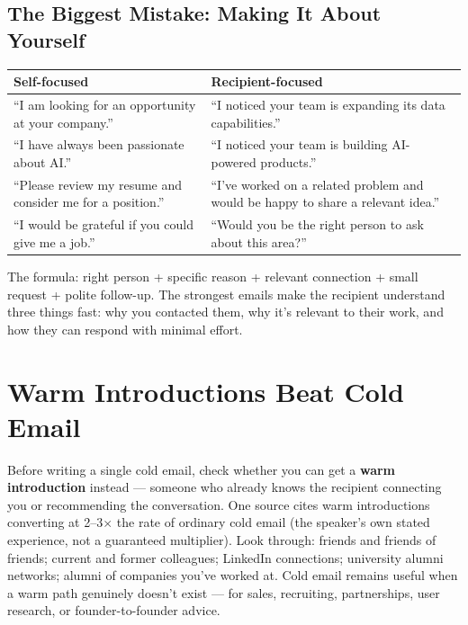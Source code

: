 \subsection{The Biggest Mistake: Making It About Yourself}

\begin{longtable}{p{} p{}}
\toprule
\textbf{Self-focused} & \textbf{Recipient-focused} \\
\midrule
\endhead
``I am looking for an opportunity at your company.'' & ``I noticed your team is expanding its data
capabilities.'' \\
``I have always been passionate about AI.'' & ``I noticed your team is building AI-powered products.'' \\
``Please review my resume and consider me for a position.'' & ``I've worked on a related problem and would be
happy to share a relevant idea.'' \\
``I would be grateful if you could give me a job.'' & ``Would you be the right person to ask about this
area?'' \\
\bottomrule
\end{longtable}

\begin{keytakeaway}
The formula: right person + specific reason + relevant connection + small request + polite follow-up. The
strongest emails make the recipient understand three things fast: why you contacted them, why it's relevant to
their work, and how they can respond with minimal effort.
\end{keytakeaway}

\section{Warm Introductions Beat Cold Email}

Before writing a single cold email, check whether you can get a \textbf{warm introduction} instead — someone who
already knows the recipient connecting you or recommending the conversation. One source cites warm introductions
converting at 2--3$\times$ the rate of ordinary cold email (the speaker's own stated experience, not a guaranteed
multiplier). Look through: friends and friends of friends; current and former colleagues; LinkedIn connections;
university alumni networks; alumni of companies you've worked at. Cold email remains useful when a warm path
genuinely doesn't exist — for sales, recruiting, partnerships, user research, or founder-to-founder advice.

